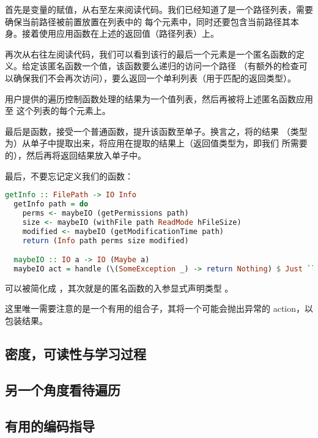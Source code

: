 \documentclass[./main.tex]{subfiles}
\begin{document}
首先是变量的赋值，从右至左来阅读代码。我们已经知道了是一个路径列表，需要确保当前路径被前置放置在列表中的
每个元素中，同时还要包含当前路径其本身。接着使用应用函数在上述的返回值（路径列表）上。

再次从右往左阅读代码，我们可以看到该行的最后一个元素是一个匿名函数的定义。给定该匿名函数一个值，该函数要么递归的访问一个路径
（有额外的检查可以确保我们不会再次访问），要么返回一个单利列表（用于匹配的返回类型）。

用户提供的遍历控制函数处理的结果为一个值列表，然后再被将上述匿名函数应用至
这个列表的每个元素上。

最后是函数，接受一个普通函数，提升该函数至单子。换言之，将的结果
（类型为）从单子中提取出来，将应用在提取的结果上（返回值类型为\acode{[Info]}，即我们
所需要的），然后再将返回结果放入单子中。

最后，不要忘记定义我们的函数：

\begin{lstlisting}[language=Haskell]
  getInfo :: FilePath -> IO Info
  getInfo path = do
    perms <- maybeIO (getPermissions path)
    size <- maybeIO (withFile path ReadMode hFileSize)
    modified <- maybeIO (getModificationTime path)
    return (Info path perms size modified)

  maybeIO :: IO a -> IO (Maybe a)
  maybeIO act = handle (\(SomeException _) -> return Nothing) $ Just `liftM` act
\end{lstlisting}

可以被简化成
，其次就是的匿名函数的入参显式声明类型
。

这里唯一需要注意的是一个有用的组合子，其将一个可能会抛出异常的 action，以包装结果。

\subsection*{密度，可读性与学习过程}



\subsection*{另一个角度看待遍历}

\subsection*{有用的编码指导}
\end{document}
